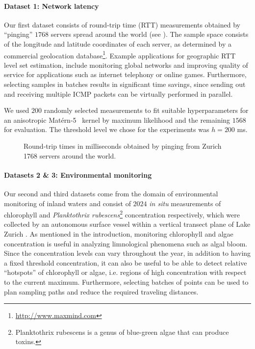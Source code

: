 \paragraph{Dataset 1: Network latency}
Our first dataset consists of round-trip time (RTT) measurements obtained
by ``pinging'' $1768$ servers spread around the world (see ).
The sample space consists of the longitude and latitude coordinates of each
server, as determined by a commercial geolocation
database\footnote{\url{http://www.maxmind.com}}.
Example applications for geographic RTT level set estimation, include
monitoring global networks and improving quality of service for applications
such as internet telephony or online games. Furthermore,
selecting samples in batches results in significant time savings, since
sending out and receiving multiple ICMP packets can be virtually performed in
parallel.

We used $200$ randomly selected measurements to fit suitable hyperparameters for
an anisotropic Mat\'{e}rn-5~\mbox{\cite{rasmussen06}} kernel by maximum
likelihood  and the remaining $1568$ for evaluation.
The threshold level we chose for the experiments was $h = 200$ ms.

%
\begin{figure}[tb]
  \centering
  \caption{Round-trip times in milliseconds obtained by pinging from Zurich
           1768 servers around the world.}
  \label{fig:map}
\end{figure}

\paragraph{Datasets 2 \& 3: Environmental monitoring}
Our second and third datasets come from the domain of environmental monitoring
of inland
waters and consist of $2024$ \emph{in situ} measurements of chlorophyll
and \emph{Planktothrix rubescens}\footnote{Planktothrix rubescens is a genus of
blue-green algae that can produce toxins.}
concentration respectively, which were collected by an autonomous surface
vessel within a vertical transect plane of Lake Zurich \cite{hitz12}.
As mentioned in the introduction,
monitoring chlorophyll and algae concentration is useful in analyzing
limnological phenomena such as algal bloom. Since the concentration levels can
vary throughout the year, in addition to having a fixed threshold
concentration, it can also be useful to be able to detect
relative ``hotspots'' of chlorophyll or algae, i.e. regions of high
concentration with respect to the current maximum. Furthermore, selecting
batches of points can be used to plan sampling paths and reduce the required
traveling distances.

